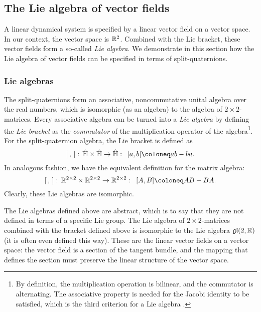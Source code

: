 \subsection{The Lie algebra of vector fields}
\label{ssec:vf_algebra}
A linear dynamical system is specified by a linear vector field on a vector space. In our context, the vector space is $\mathbb{R}^2$. Combined with the Lie bracket, these vector fields form a so-called \emph{Lie algebra}. We demonstrate in this section how the Lie algebra of vector fields can be specified in terms of split-quaternions.

\subsubsection{Lie algebras}
The split-quaternions form an associative, noncommutative unital algebra over the real numbers, which is isomorphic (as an algebra) to the algebra of $2\times 2$-matrices. Every associative algebra can be turned into a \emph{Lie algebra} by defining the \emph{Lie bracket} as the \emph{commutator} of the multiplication operator of the algebra\footnote{By definition, the multiplication operation is bilinear, and the commutator is alternating. The associative property is needed for the Jacobi identity to be satisfied, which is the third criterion for a Lie algebra \cite{bourbaki1975}.}. For the split-quaternion algebra, the Lie bracket is defined as
\begin{equation}
    \liebr{\,}{}:\, \spquaternions \times \spquaternions \to \spquaternions: \;\: [a, b] \coloneq ab - ba.
\end{equation}
In analogous fashion, we have the equivalent definition for the matrix algebra:
\begin{equation}
    \liebr{\,}{}:\, \real^{2\times 2} \times \real^{2\times 2} \to \real^{2\times 2}: \;\: [A, B] \coloneq AB - BA.
\end{equation}
Clearly, these Lie algebras are isomorphic.

The Lie algebras defined above are abstract, which is to say that they are not defined in terms of a specific Lie group. The Lie algebra of $2\times 2$-matrices combined with the bracket defined above is isomorphic to the Lie algebra $\mathfrak{gl}(2, \mathbb{R})$ (it is often even defined this way). These are the linear vector fields on a vector space: the vector field is a section of the tangent bundle, and the mapping that defines the section must preserve the linear structure of the vector space. 

